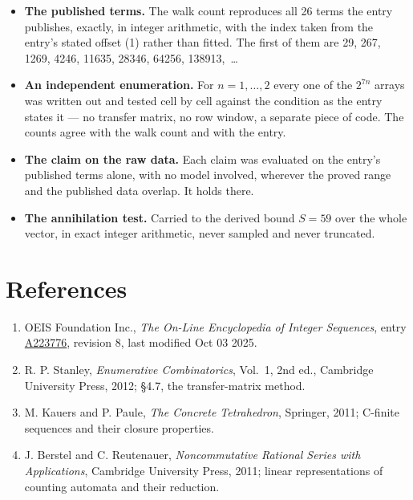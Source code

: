 \documentclass[11pt]{article}
\theoremstyle{definition}
\begin{document}
\begin{itemize}

\item {\bfseries The published terms.} The walk count reproduces all 26 terms the entry publishes, exactly, in integer arithmetic, with the index taken from the entry's stated offset (1) rather than fitted. The first of them are 29, 267, 1269, 4246, 11635, 28346, 64256, 138913,~\dots

\item {\bfseries An independent enumeration.} For $n = 1,\dots,2$ every one of the $2^{7n}$ arrays was written out and tested cell by cell against the condition as the entry states it --- no transfer matrix, no row window, a separate piece of code. The counts agree with the walk count and with the entry.

\item {\bfseries The claim on the raw data.} Each claim was evaluated on the entry's published terms alone, with no model involved, wherever the proved range and the published data overlap. It holds there.

\item {\bfseries The annihilation test.} Carried to the derived bound $S = 59$ over the whole vector, in exact integer arithmetic, never sampled and never truncated.

\end{itemize}

\section{References}

\begin{enumerate}

\item OEIS Foundation Inc., \emph{The On-Line Encyclopedia of Integer Sequences}, entry \href{https://oeis.org/A223776}{A223776}, revision 8, last modified Oct 03 2025.

\item R. P. Stanley, \emph{Enumerative Combinatorics}, Vol.~1, 2nd ed., Cambridge University Press, 2012; \S4.7, the transfer-matrix method.

\item M. Kauers and P. Paule, \emph{The Concrete Tetrahedron}, Springer, 2011; C-finite sequences and their closure properties.

\item J. Berstel and C. Reutenauer, \emph{Noncommutative Rational Series with Applications}, Cambridge University Press, 2011; linear representations of counting automata and their reduction.

\end{enumerate}
\end{document}
